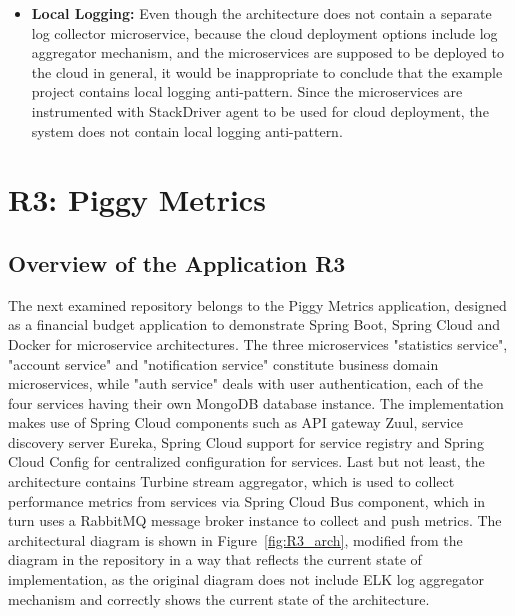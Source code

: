 \documentclass{Configuration_Files/PoliMi3i_thesis}
\begin{document}
\begin{itemize}
    \item \textbf{Local Logging:} Even though the architecture does not contain a separate log collector microservice, because the cloud deployment options include log aggregator mechanism, and the microservices are supposed to be deployed to the cloud in general, it would be inappropriate to conclude that the example project contains local logging anti-pattern.
    Since the microservices are instrumented with StackDriver agent to be used for cloud deployment, the system does not contain local logging anti-pattern.
\end{itemize}

\section{R3: Piggy Metrics}
\label{sec:R3}

\subsection{Overview of the Application R3}
\label{subsec:R3_overview}

The next examined repository belongs to the Piggy Metrics application, designed as a financial budget application to demonstrate Spring Boot, Spring Cloud and Docker for microservice architectures.
The three microservices "statistics service", "account service" and "notification service" constitute business domain microservices, while "auth service" deals with user authentication, each of the four services having their own MongoDB database instance.
The implementation makes use of Spring Cloud components such as API gateway Zuul\footnotemark[76], service discovery server Eureka, Spring Cloud support for service registry and Spring Cloud Config\footnotemark[77] for centralized configuration for services.
Last but not least, the architecture contains Turbine stream aggregator\footnotemark[78], which is used to collect performance metrics from services via Spring Cloud Bus\footnotemark[79] component, which in turn uses a RabbitMQ message broker instance to collect and push metrics.
The architectural diagram is shown in Figure~\ref{fig:R3_arch}, modified from the diagram in the repository in a way that reflects the current state of implementation, as the original diagram does not include ELK log aggregator mechanism and correctly shows the current state of the architecture.
\end{document}
